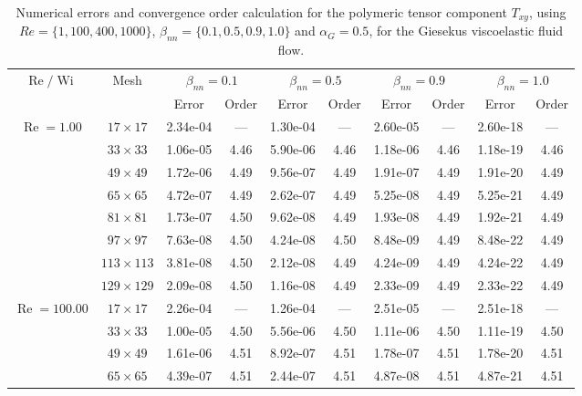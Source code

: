 \documentclass[preprint, 12pt]{elsarticle}
\begin{document}
{\begin{center}
\begin{table}[H]
\caption{Numerical errors and convergence order calculation for the polymeric tensor component $T_{xy}$, using $Re=\{1,100,400,1000\}$, $\beta_{nn}=\{0.1,0.5,0.9,1.0\}$ and \mbox{$\alpha_G = 0.5$}, for the Giesekus viscoelastic fluid flow.\label{tab_GiesekusTxyalphaG05Wi5_10}}
\tiny{
    \begin{tabular*}{\textwidth}{@{\extracolsep\fill}cccccccccc@{}}
    \hline
    \multirow{2}{*}{$\operatorname{Re}/\operatorname{Wi}$} & \multirow{2}{*}{Mesh} & \multicolumn{2}{c}{$\beta_{nn}=0.1$}  & \multicolumn{2}{c}{$\beta_{nn}=0.5$}  & \multicolumn{2}{c}{$\beta_{nn}=0.9$}  & \multicolumn{2}{c}{$\beta_{nn}=1.0$}\\ %
     & & Error & Order & Error & Order & Error & Order & Error & Order \\
    \hline
    \multirow{7}{*}{$\operatorname{Re}=1.00$} & $17\times 17$ & 2.34e-04 & --- & 1.30e-04 & --- & 2.60e-05 & --- & 2.60e-18 & --- \\
    & $33\times 33$ & 1.06e-05 & 4.46 & 5.90e-06 & 4.46 & 1.18e-06 & 4.46 & 1.18e-19 & 4.46 \\
    & $49\times 49$ & 1.72e-06 & 4.49 & 9.56e-07 & 4.49 & 1.91e-07 & 4.49 & 1.91e-20 & 4.49 \\
    \multirow{3}{*}{$\operatorname{Wi}=5$} & $65\times 65$ & 4.72e-07 & 4.49 & 2.62e-07 & 4.49 & 5.25e-08 & 4.49 & 5.25e-21 & 4.49 \\
    & $81\times 81$ & 1.73e-07 & 4.50 & 9.62e-08 & 4.49 & 1.93e-08 & 4.49 & 1.92e-21 & 4.49 \\
    & $97\times 97$ & 7.63e-08 & 4.50 & 4.24e-08 & 4.50 & 8.48e-09 & 4.49 & 8.48e-22 & 4.49 \\
    & $113\times 113$ & 3.81e-08 & 4.50 & 2.12e-08 & 4.49 & 4.24e-09 & 4.49 & 4.24e-22 & 4.49 \\
    & $129\times 129$ & 2.09e-08 & 4.50 & 1.16e-08 & 4.49 & 2.33e-09 & 4.49 & 2.33e-22 & 4.49 \\
    \hline
    \multirow{7}{*}{$\operatorname{Re}=100.00$} & $17\times 17$ & 2.26e-04 & --- & 1.26e-04 & --- & 2.51e-05 & --- & 2.51e-18 & --- \\
    & $33\times 33$ & 1.00e-05 & 4.50 & 5.56e-06 & 4.50 & 1.11e-06 & 4.50 & 1.11e-19 & 4.50 \\
    & $49\times 49$ & 1.61e-06 & 4.51 & 8.92e-07 & 4.51 & 1.78e-07 & 4.51 & 1.78e-20 & 4.51 \\
    \multirow{3}{*}{$\operatorname{Wi}=5$} & $65\times 65$ & 4.39e-07 & 4.51 & 2.44e-07 & 4.51 & 4.87e-08 & 4.51 & 4.87e-21 & 4.51 \\

\end{tabular*}}
\end{table}
\end{center}}
\end{document}
